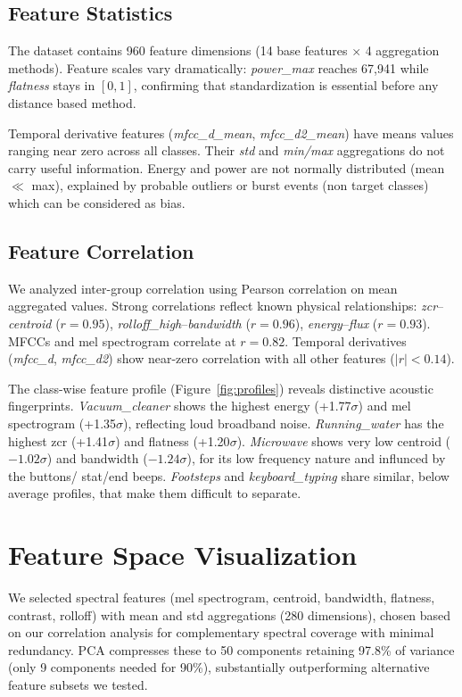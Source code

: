 \documentclass{article}
\begin{document}
\subsection{Feature Statistics}
The dataset contains 960 feature dimensions (14 base features $\times$ 4 aggregation methods). Feature scales vary dramatically: \textit{power\_max} reaches 67,941 while \textit{flatness} stays in $[0, 1]$, confirming that standardization is essential before any distance based method.

Temporal derivative features (\textit{mfcc\_d\_mean}, \textit{mfcc\_d2\_mean}) have means values ranging near zero across all classes. Their \textit{std} and \textit{min/max} aggregations do not carry useful information. Energy and power are not normally distributed (mean $\ll$ max), explained by probable outliers or burst events (non target classes) which can be considered as bias. 

\subsection{Feature Correlation}
We analyzed inter-group correlation using Pearson correlation on mean aggregated values. Strong correlations reflect known physical relationships: \textit{zcr}--\textit{centroid} ($r = 0.95$), \textit{rolloff\_high}--\textit{bandwidth} ($r = 0.96$), \textit{energy}--\textit{flux} ($r = 0.93$). MFCCs and mel spectrogram correlate at $r = 0.82$. Temporal derivatives (\textit{mfcc\_d}, \textit{mfcc\_d2}) show near-zero correlation with all other features ($|r| < 0.14$).

The class-wise feature profile (Figure~\ref{fig:profiles}) reveals distinctive acoustic fingerprints. \textit{Vacuum\_cleaner} shows the highest energy (+1.77$\sigma$) and mel spectrogram (+1.35$\sigma$), reflecting loud broadband noise. \textit{Running\_water} has the highest zcr (+1.41$\sigma$) and flatness (+1.20$\sigma$). \textit{Microwave} shows very low centroid ($-1.02\sigma$) and bandwidth ($-1.24\sigma$), for its low frequency nature and influnced by the buttons/ stat/end beeps. \textit{Footsteps} and \textit{keyboard\_typing} share similar, below average profiles, that make them difficult to separate.

\section{Feature Space Visualization}
We selected spectral features (mel spectrogram, centroid, bandwidth, flatness, contrast, rolloff) with mean and std aggregations (280 dimensions), chosen based on our correlation analysis for complementary spectral coverage with minimal redundancy. PCA compresses these to 50 components retaining 97.8\% of variance (only 9 components needed for 90\%), substantially outperforming alternative feature subsets we tested.
\end{document}
